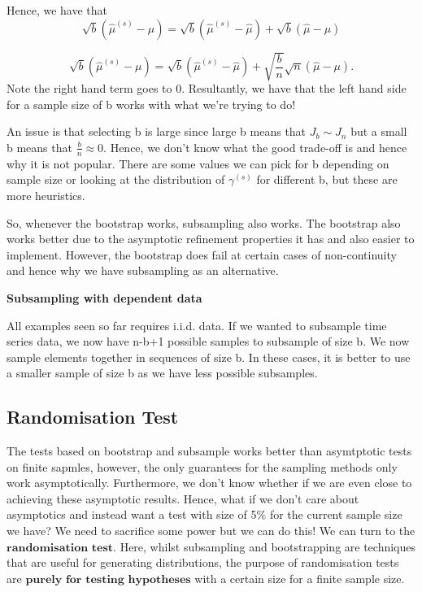 \documentclass[twoside]{article}
\begin{document}
Hence, we have that
$$
\sqrt{b}(\hat{\mu}^{(s)} - \mu) = \sqrt{b}(\hat{\mu}^{(s)} - \hat{\mu}) + \sqrt{b}(\hat{\mu} - \mu)
$$

$$
\sqrt{b}(\hat{\mu}^{(s)} - \mu) = \sqrt{b}(\hat{\mu}^{(s)} - \hat{\mu}) + \sqrt{\frac{b}{n}}\sqrt{n}(\hat{\mu} - \mu).
$$
Note the right hand term goes to 0. Resultantly, we have that the left hand side for a sample size of b works with what we're trying to do!

An issue is that selecting b is large since large b means that $J_b \sim J_n$ but a small b means that $\frac{b}{n} \approx 0$. Hence, we don't know what the good trade-off is and hence why it is not popular. There are some values we can pick for b depending on sample size or looking at the distribution of $\gamma^{(s)}$ for different b, but these are more heuristics.

So, whenever the bootstrap works, subsampling also works. The bootstrap also works better due to the asymptotic refinement properties it has and also easier to implement. However, the bootstrap does fail at certain cases of non-continuity and hence why we have subsampling as an alternative.

\bigskip
\textbf{Subsampling with dependent data}
\bigskip

All examples seen so far requires i.i.d. data. If we wanted to subsample time series data, we now have n-b+1 possible samples to subsample of size b. We now sample elements together in sequences of size b. In these cases, it is better to use a smaller sample of size b as we have less possible subsamples.

\subsection{Randomisation Test}
The tests based on bootstrap and subsample works better than asymtptotic tests on finite sapmles, however, the only guarantees for the sampling methods only work asymptotically. Furthermore, we don't know whether if we are even close to achieving these asymptotic results. Hence, what if we don't care about asymptotics and instead want a test with size of 5\% for the current sample size we have? We need to sacrifice some power but we can do this! We can turn to the $\textbf{randomisation test}$. Here, whilst subsampling and bootstrapping are techniques that are useful for generating distributions, the purpose of randomisation tests are $\textbf{purely for testing hypotheses}$ with a certain size for a finite sample size.
\end{document}
